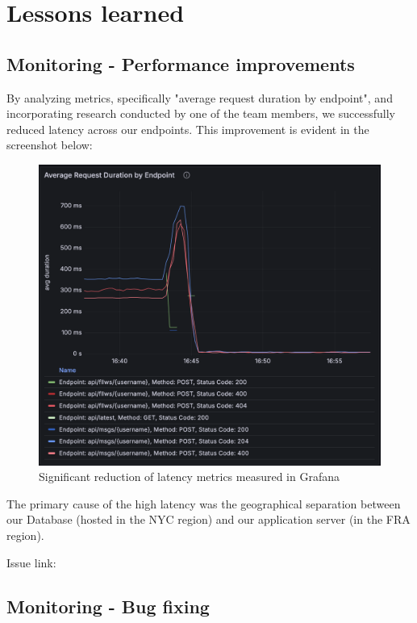 \section{Lessons learned}

\subsection{Monitoring - Performance improvements}
By analyzing metrics, specifically "average request duration by endpoint", and incorporating research conducted by one of the team members, we successfully reduced latency across our endpoints. This improvement is evident in the screenshot below: 
\begin{figure}[H]
    \centering
    \includegraphics[height=0.9\textwidth]{images/grafana-endpoints-latency.png}
    \caption{Significant reduction of latency metrics measured in Grafana}
    \label{fig:grafana-endpoints-latency}
\end{figure}

The primary cause of the high latency was the geographical separation between our Database (hosted in the NYC region) and our application server (in the FRA region).

Issue link: 

\subsection{Monitoring - Bug fixing}

